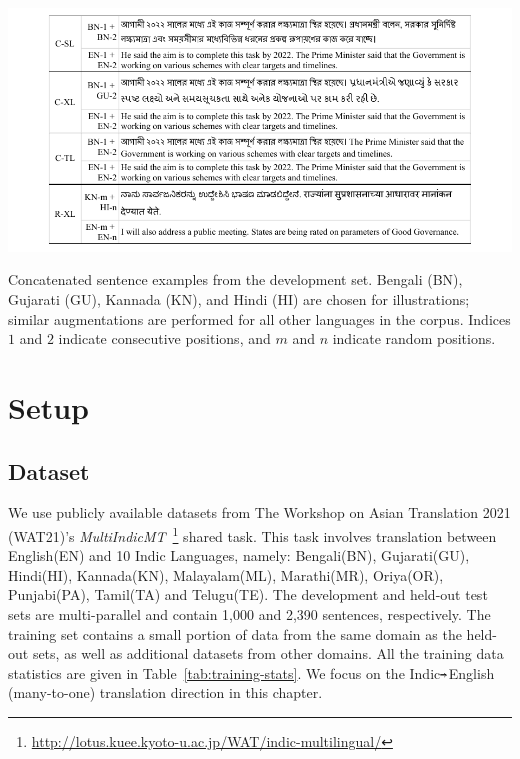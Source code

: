 \begin{table}[htb]
    \centering
    \includegraphics[width=0.99\linewidth,trim={12mm 2mm 12mm 2mm},clip]{img/robustness/example-concat-devs.pdf}
    \caption{Concatenated sentence examples from the development set. 
    Bengali (BN), Gujarati (GU), Kannada (KN), and Hindi (HI) are chosen for illustrations; similar augmentations are performed for all other languages in the corpus.
    Indices $1$ and $2$ indicate consecutive positions, and $m$ and $n$ indicate random positions.}
    \label{tab:dev-aug-example}
\end{table}

\section{Setup}
\label{sec:setup}

\subsection{Dataset}
\label{ch:rtobustness-sec:dataset}
We use publicly available datasets from The Workshop on Asian Translation 2021 (WAT21)'s  \textit{MultiIndicMT}~\cite{nakazawa-etal-2021-overview}\footnote{\url{http://lotus.kuee.kyoto-u.ac.jp/WAT/indic-multilingual/}} shared task. This task involves translation between English(EN) and 10 Indic Languages, namely: Bengali(BN), Gujarati(GU), Hindi(HI), Kannada(KN), Malayalam(ML), Marathi(MR), Oriya(OR), Punjabi(PA), Tamil(TA) and Telugu(TE). 
The development and held-out test sets are multi-parallel and contain 1,000 and 2,390 sentences, respectively. 
The training set contains a small portion of data from the same domain as the held-out sets, as well as additional datasets from other domains.
All the training data statistics are given in Table~\ref{tab:training-stats}.
We focus on the Indic$\shortarrow$English (many-to-one) translation direction in this chapter.

